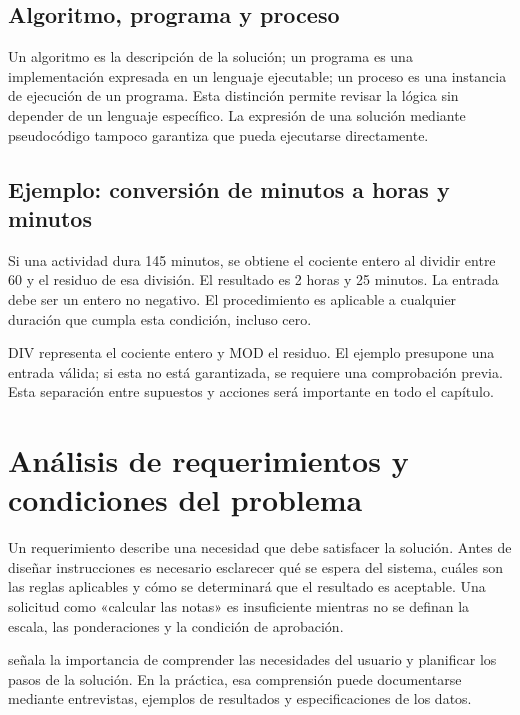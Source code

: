 

\subsection{Algoritmo, programa y proceso}

Un algoritmo es la descripción de la solución; un programa es una implementación expresada en un lenguaje ejecutable; un proceso es una instancia de ejecución de un programa. Esta distinción permite revisar la lógica sin depender de un lenguaje específico. La expresión de una solución mediante pseudocódigo tampoco garantiza que pueda ejecutarse directamente.

\subsection{Ejemplo: conversión de minutos a horas y minutos}

Si una actividad dura 145 minutos, se obtiene el cociente entero al dividir entre 60 y el residuo de esa división. El resultado es 2 horas y 25 minutos. La entrada debe ser un entero no negativo. El procedimiento es aplicable a cualquier duración que cumpla esta condición, incluso cero.


DIV representa el cociente entero y MOD el residuo. El ejemplo presupone una entrada válida; si esta no está garantizada, se requiere una comprobación previa. Esta separación entre supuestos y acciones será importante en todo el capítulo.

\section{Análisis de requerimientos y condiciones del problema}

Un requerimiento describe una necesidad que debe satisfacer la solución. Antes de diseñar instrucciones es necesario esclarecer qué se espera del sistema, cuáles son las reglas aplicables y cómo se determinará que el resultado es aceptable. Una solicitud como «calcular las notas» es insuficiente mientras no se definan la escala, las ponderaciones y la condición de aprobación.

\textcite[pp.~8–10]{farrell2013} señala la importancia de comprender las necesidades del usuario y planificar los pasos de la solución. En la práctica, esa comprensión puede documentarse mediante entrevistas, ejemplos de resultados y especificaciones de los datos.

